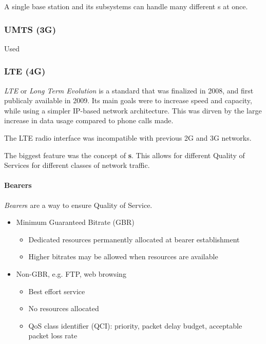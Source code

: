 A single base station and its subsystems can handle many different s at once.

\subsubsection{UMTS (3G)}\label{subsubsec:3G}
Used 

\subsubsection{LTE (4G)}\label{subsubsec:4G}
\begin{definition}[LTE]\label{def:LTE}
  \emph{LTE} or \emph{Long Term Evolution} is a standard that was finalized in 2008, and first publicaly available in 2009.
  Its main goals were to increase speed and capacity, while using a simpler IP-based network architecture.
  This was dirven by the large increase in data usage compared to phone calls made.

  The LTE radio interface was incompatible with previous 2G and 3G networks.

  The biggest feature was the concept of \textbf{s}.
  This allows for different Quality of Services for different classes of network traffic.
\end{definition}

\paragraph{Bearers}\label{par:Bearers}
\begin{definition}[Bearer]\label{def:Bearer}
  \emph{Bearer}s are a way to ensure Quality of Service.

  \begin{itemize}[noitemsep]
  \item Minimum Guaranteed Bitrate (GBR)
    \begin{itemize}[noitemsep]
    \item Dedicated resources permanently allocated at bearer establishment
    \item Higher bitrates may be allowed when resources are available
    \end{itemize}

  \item Non-GBR, e.g. FTP, web browsing
    \begin{itemize}[noitemsep]
    \item Best effort service
    \item No resources allocated
    \item QoS class identifier (QCI): priority, packet delay budget, acceptable packet loss rate
    \end{itemize}
  \end{itemize}
\end{definition}

